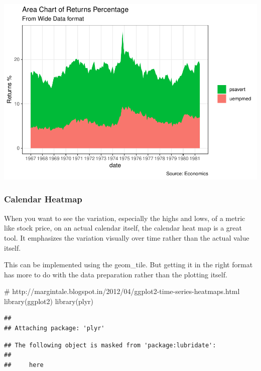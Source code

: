 \documentclass[a4paper]{article}
\newenvironment{Shaded}{}{}
\newcommand{\KeywordTok}[1]{\textcolor[rgb]{0.00,0.00,1.00}{#1}}
\newcommand{\CommentTok}[1]{\textcolor[rgb]{0.00,0.50,0.00}{#1}}
\newcommand{\NormalTok}[1]{#1}
\begin{document}
\includegraphics{M24-ggplot2_Gallery_files/figure-latex/unnamed-chunk-47-1.pdf}

\newpage

\subsubsection{Calendar Heatmap}\label{calendar-heatmap}

When you want to see the variation, especially the highs and lows, of a
metric like stock price, on an actual calendar itself, the calendar heat
map is a great tool. It emphasizes the variation visually over time
rather than the actual value itself.

This can be implemented using the geom\_tile. But getting it in the
right format has more to do with the data preparation rather than the
plotting itself.

\begin{Shaded}
\begin{Highlighting}[]
\CommentTok{# http://margintale.blogspot.in/2012/04/ggplot2-time-series-heatmaps.html}
\KeywordTok{library}\NormalTok{(ggplot2)}
\KeywordTok{library}\NormalTok{(plyr)}
\end{Highlighting}
\end{Shaded}

\begin{verbatim}
## 
## Attaching package: 'plyr'
\end{verbatim}

\begin{verbatim}
## The following object is masked from 'package:lubridate':
## 
##     here
\end{verbatim}
\end{document}
